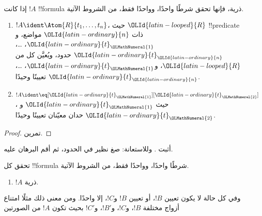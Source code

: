 \documentclass[../../../include/open-logic-section]{subfiles}
\begin{document}
\begin{prop}
إذا كانت $!A$ !!{formula} ذرية، فإنها تحقق شرطًا واحدًا، وواحدًا فقط،
من الشروط الآتية.
\begin{enumerate}
\item $!A \ident \Atom{R}{t_1,\dots,t_n}$، حيث ${\OLId{latin-looped}{R}}$ !!{predicate}
  ذات ${\OLId{latin-ordinary}{n}}$ مواضع، و${\OLId{latin-ordinary}{t}}_{\OLMathNumeral{1}}$، \dots، ${\OLId{latin-ordinary}{t}}_{\OLId{latin-ordinary}{n}}$ حدود، ويُعيَّن كل من ${\OLId{latin-looped}{R}}$،
  و${\OLId{latin-ordinary}{t}}_{\OLMathNumeral{1}}$، \dots، ${\OLId{latin-ordinary}{t}}_{\OLId{latin-ordinary}{n}}$ تعيينًا وحيدًا.
\item $!A \ident \eq[{\OLId{latin-ordinary}{t}}_{\OLMathNumeral{1}}][{\OLId{latin-ordinary}{t}}_{\OLMathNumeral{2}}]$، حيث ${\OLId{latin-ordinary}{t}}_{\OLMathNumeral{1}}$ و${\OLId{latin-ordinary}{t}}_{\OLMathNumeral{2}}$ حدان معيّنان
  تعيينًا وحيدًا.
\end{enumerate}
\end{prop}

\begin{proof}
تمرين.
\end{proof}

\begin{prob}
أثبت . وللاستعانة: صغ نظير
 في الحدود، ثم أقم البرهان عليه.
\end{prob}

\begin{prop}
تحقق كل !!{formula} شرطًا واحدًا، وواحدًا فقط، من الشروط الآتية.
\begin{enumerate}
\item $!A$ ذرية.







\end{enumerate}
وفي كل حالة لا يكون تعيين $!B$، أو تعيين $!B$ و$!C$، إلا واحدًا.
ومن معنى ذلك مثلًا امتناع أزواج مختلفة $!B$، و$!C$، و$!B'$،
و$!C'$ بحيث تكون $!A$ من الصورتين
\end{prop}
\end{document}
